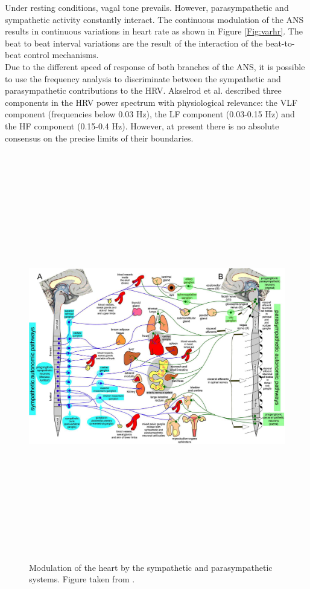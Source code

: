 \documentclass[12pt,lot, lof]{puthesis}
\begin{document}
Under resting conditions, vagal tone prevails. However, parasympathetic and 
sympathetic activity constantly interact. The continuous modulation of the 
\gls{ANS} results in continuous variations in heart rate as shown in Figure 
\ref{Fig:varhr}. The beat to beat interval variations are the result of the 
interaction of the beat-to-beat control mechanisms.\\

Due to the different speed of response of both branches of the \gls{ANS}, it is 
possible to use the frequency analysis to discriminate between the sympathetic 
and parasympathetic contributions to the \gls{HRV}. Akselrod et 
al.\cite{akselrod1981} described three components in the \gls{HRV} power 
spectrum
with physiological relevance: the \gls{VLF} component (frequencies below 0.03 
Hz),
the \gls{LF} component (0.03-0.15 Hz) and the \gls{HF} component
(0.15-0.4 Hz). However, at present there is no absolute consensus on the 
precise limits of their
boundaries.\\



\begin{figure}[H]
\begin{center}
\includegraphics[angle=90,height=7in]{figures/influencia.pdf}
\caption[Modulation of the heart rate by the ANS]{\label{fig:influencia} 
Modulation of the heart by the sympathetic and parasympathetic systems. Figure 
taken from \cite{ansScholar}.}
\end{center}
\end{figure} 
\end{document}
